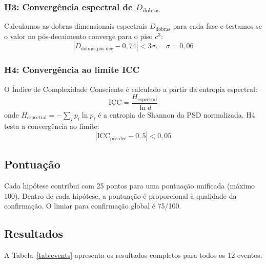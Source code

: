 \documentclass[12pt,a4paper,twocolumn]{article}
\newcommand{\Dfolds}{D_{\text{dobras}}}
\newcommand{\CCI}{\text{ICC}}
\begin{document}
\subsubsection{H3: Convergência espectral de $\Dfolds$}

Calculamos as dobras dimensionais espectrais $\Dfolds$ para cada fase e testamos se o valor no pós-decaimento converge para o piso $c^3$:
\begin{equation}
|D_{\text{dobras,pós-dec}} - 0{,}74| < 3\sigma, \quad \sigma = 0{,}06
\end{equation}

\subsubsection{H4: Convergência ao limite ICC}

O Índice de Complexidade Consciente é calculado a partir da entropia espectral:
\begin{equation}
\CCI = \frac{H_{\text{espectral}}}{\ln d}
\end{equation}
onde $H_{\text{espectral}} = -\sum_i p_i \ln p_i$ é a entropia de Shannon da PSD normalizada. H4 testa a convergência ao limite:
\begin{equation}
|\CCI_{\text{pós-dec}} - 0{,}5| < 0{,}05
\end{equation}

\subsection{Pontuação}

Cada hipótese contribui com 25 pontos para uma pontuação unificada (máximo 100). Dentro de cada hipótese, a pontuação é proporcional à qualidade da confirmação. O limiar para confirmação global é 75/100.

\subsection{Resultados}

A Tabela~\ref{tab:events} apresenta os resultados completos para todos os 12 eventos.
\end{document}
